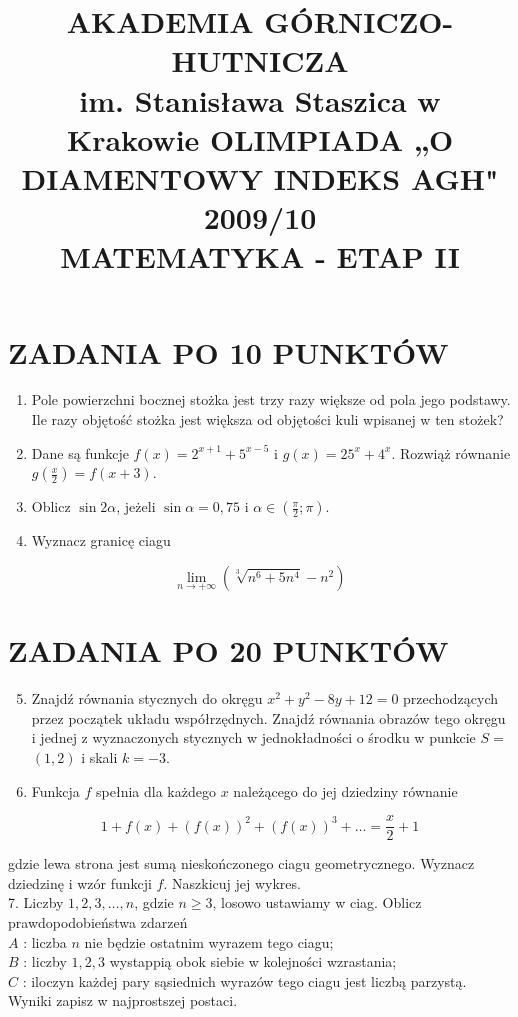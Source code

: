 \documentclass[10pt]{article}
\title{AKADEMIA GÓRNICZO-HUTNICZA \\
 im. Stanisława Staszica w Krakowie OLIMPIADA „O DIAMENTOWY INDEKS AGH" 2009/10 \\
 MATEMATYKA - ETAP II }
\author{}
\date{}
\begin{document}
\maketitle
\section*{ZADANIA PO 10 PUNKTÓW}
\begin{enumerate}
  \item Pole powierzchni bocznej stożka jest trzy razy większe od pola jego podstawy. Ile razy objętość stożka jest większa od objętości kuli wpisanej w ten stożek?
  \item Dane są funkcje $f(x)=2^{x+1}+5^{x-5}$ i $g(x)=25^{x}+4^{x}$. Rozwiąż równanie $g\left(\frac{x}{2}\right)=f(x+3)$.
  \item Oblicz $\sin 2 \alpha$, jeżeli $\sin \alpha=0,75$ i $\alpha \in\left(\frac{\pi}{2} ; \pi\right)$.
  \item Wyznacz granicę ciagu
\end{enumerate}

$$
\lim _{n \rightarrow+\infty}\left(\sqrt[3]{n^{6}+5 n^{4}}-n^{2}\right)
$$

\section*{ZADANIA PO 20 PUNKTÓW}
\begin{enumerate}
  \setcounter{enumi}{4}
  \item Znajdź równania stycznych do okręgu $x^{2}+y^{2}-8 y+12=0$ przechodzących przez początek układu współrzędnych. Znajdź równania obrazów tego okręgu i jednej z wyznaczonych stycznych w jednokładności o środku w punkcie $S=$ $(1,2)$ i skali $k=-3$.
  \item Funkcja $f$ spełnia dla każdego $x$ należącego do jej dziedziny równanie
\end{enumerate}

$$
1+f(x)+(f(x))^{2}+(f(x))^{3}+\ldots=\frac{x}{2}+1
$$

gdzie lewa strona jest sumą nieskończonego ciagu geometrycznego. Wyznacz dziedzinę i wzór funkcji $f$. Naszkicuj jej wykres.\\
7. Liczby $1,2,3, \ldots, n$, gdzie $n \geq 3$, losowo ustawiamy w ciag. Oblicz prawdopodobieństwa zdarzeń\\
$A$ : liczba $n$ nie będzie ostatnim wyrazem tego ciagu;\\
$B$ : liczby $1,2,3$ wystappią obok siebie w kolejności wzrastania;\\
$C$ : iloczyn każdej pary sąsiednich wyrazów tego ciagu jest liczbą parzystą. Wyniki zapisz w najprostszej postaci.
\end{document}
